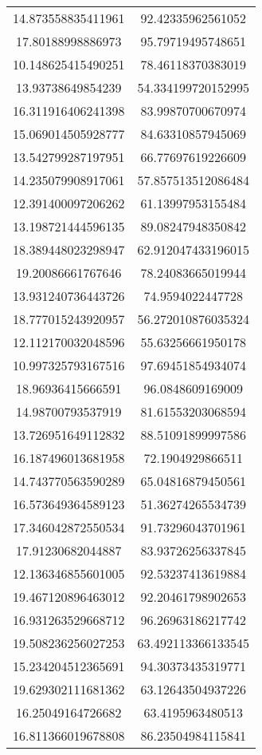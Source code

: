 \begin{table}
\begin{tabular}{cc}
14.873558835411961 & 92.42335962561052 \\
17.80188998886973 & 95.79719495748651 \\
10.148625415490251 & 78.46118370383019 \\
13.93738649854239 & 54.334199720152995 \\
16.311916406241398 & 83.99870700670974 \\
15.069014505928777 & 84.63310857945069 \\
13.542799287197951 & 66.77697619226609 \\
14.235079908917061 & 57.857513512086484 \\
12.391400097206262 & 61.13997953155484 \\
13.198721444596135 & 89.08247948350842 \\
18.389448023298947 & 62.912047433196015 \\
19.20086661767646 & 78.24083665019944 \\
13.931240736443726 & 74.9594022447728 \\
18.777015243920957 & 56.272010876035324 \\
12.112170032048596 & 55.63256661950178 \\
10.997325793167516 & 97.69451854934074 \\
18.96936415666591 & 96.0848609169009 \\
14.98700793537919 & 81.61553203068594 \\
13.726951649112832 & 88.51091899997586 \\
16.187496013681958 & 72.1904929866511 \\
14.743770563590289 & 65.04816879450561 \\
16.573649364589123 & 51.36274265534739 \\
17.346042872550534 & 91.73296043701961 \\
17.91230682044887 & 83.93726256337845 \\
12.136346855601005 & 92.53237413619884 \\
19.467120896463012 & 92.20461798902653 \\
16.931263529668712 & 96.26963186217742 \\
19.508236256027253 & 63.492113366133545 \\
15.234204512365691 & 94.30373435319771 \\
19.629302111681362 & 63.12643504937226 \\
16.25049164726682 & 63.4195963480513 \\
16.811366019678808 & 86.23504984115841 \\

\end{tabular}
\end{table}
